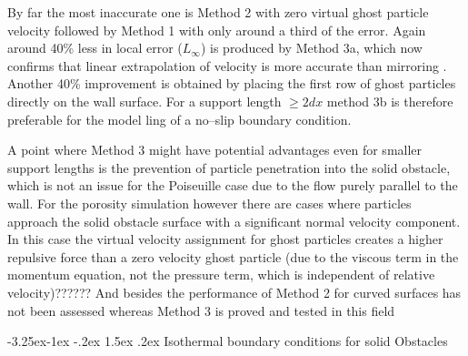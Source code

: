 \documentclass{report}
\makeatletter
\renewcommand\paragraph{\@startsection{paragraph}{4}{\z@}%
  {-3.25ex\@plus -1ex \@minus -.2ex}%
  {1.5ex \@plus .2ex}%
  {\normalfont\normalsize\bfseries}}
\makeatother
\begin{document}
 By far the most inaccurate one is Method 2 with zero virtual ghost particle velocity followed by Method 1 with only around a third of the error. Again around 40\% less in local error ($L_\infty$) is produced by Method 3a, which now confirms that linear extrapolation of velocity is more accurate than mirroring \cite{Basa2009}. Another 40\% improvement is obtained by placing the first row of ghost particles directly on the wall surface.
For a support length $\geq2dx$ method 3b is therefore preferable for the model ling of a no--slip boundary condition. 

A point where Method 3 might have potential advantages even for smaller support lengths is the prevention of particle penetration into the solid obstacle, which is not an issue for the Poiseuille case due to the flow purely parallel to the wall. For the porosity simulation however there are cases where particles approach the solid obstacle surface with a significant normal velocity component. In this case the virtual velocity assignment for ghost particles creates a higher repulsive force than a zero velocity ghost particle (due to the viscous term in the momentum equation, not the pressure term, which is independent of relative velocity)??????
And besides the performance of Method 2 for curved surfaces has not been assessed whereas Method 3 is proved and tested in this field \cite{Morris1997, Zhu1999}





\paragraph{Isothermal boundary conditions for solid Obstacles}
\label{sec:TestSolobs_BC_Isothermal}
\end{document}
